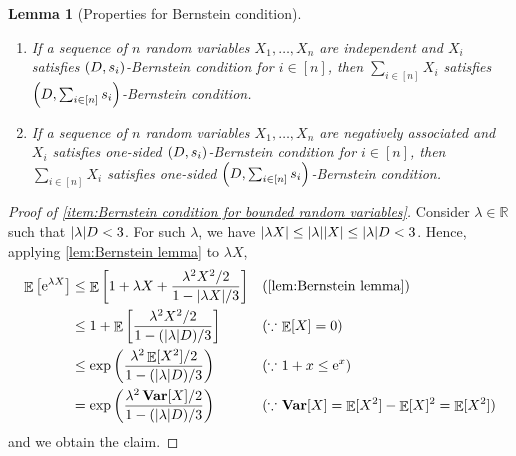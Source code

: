 \documentclass[letterpaper,11pt]{article}
\newtheorem{lemma}[theorem]{Lemma}
\DeclareMathOperator*{\E}{\mathbb{E}}
\DeclareMathOperator*{\Var}{\mathbf{Var}}
\newcommand{\e}{\mathrm{e}}
\newcommand{\bounded}{D}
\newcommand{\variance}{s}
\begin{document}
\begin{lemma}[Properties for Bernstein condition]
\begin{enumerate}
            In particular,
              if $X$ satisfies one-sided $\qty(\bounded,\variance)$-Bernstein condition and $Y\leq  X$,  
              then $Y$ satisfies one-sided $\qty(\bounded, \variance)$-Bernstein condition.
            \item \label{item:BC for independent rvs} 
            If a sequence of $n$ random variables $X_1,\ldots,X_n$ are independent and $X_i$ satisfies $\qty(D,s_i)$-Bernstein condition for $i\in [n]$, 
            then $\sum_{i\in [n]}X_i$ satisfies $\qty(D,\sum_{i\in [n]}s_i)$-Bernstein condition. 
            \item \label{item:BC for NA rvs} 
            If a sequence of $n$ random variables $X_1,\ldots,X_n$ are negatively associated and $X_i$ satisfies one-sided $\qty(D,s_i)$-Bernstein condition for $i\in [n]$, 
            then $\sum_{i\in [n]}X_i$ satisfies one-sided $\qty(D,\sum_{i\in [n]}s_i)$-Bernstein condition. 
        \end{enumerate}
    \end{lemma}
    \begin{proof}[Proof of \ref{item:Bernstein condition for bounded random variables}]
    Consider $\lambda\in \mathbb{R}$ such that $\abs{\lambda} \bounded<3$.
    For such $\lambda$, we have $\abs{\lambda X}\leq \abs{\lambda}\abs{X}\leq \abs{\lambda} \bounded<3$.
    Hence, applying \cref{lem:Bernstein lemma} to $\lambda X$, 
    \begin{align*}
    \E\qty[\e^{\lambda X}]
    &\leq \E\qty[1+\lambda X+\frac{\lambda^2X^2/2}{1-\abs{\lambda X}/3}] &&(\textrm{\cref{lem:Bernstein lemma}})\\
    &\leq 1+\E\qty[\frac{\lambda^2X^2/2}{1-(\abs{\lambda} D)/3}] &&(\textrm{$\because$ $\E[X]=0$})\\
    &\leq \exp\qty(\frac{\lambda^2\E[X^2]/2}{1-(\abs{\lambda} D)/3}) &&(\textrm{$\because$ $1+x\leq \e^x$})\\
    &= \exp\qty(\frac{\lambda^2\Var[X]/2}{1-(\abs{\lambda} D)/3}) &&(\textrm{$\because$ $\Var[X]=\E[X^2]-\E[X]^2=\E[X^2]$})
    \end{align*}
    and we obtain the claim.
  \end{proof}
\end{document}
